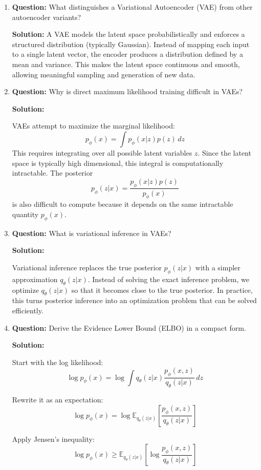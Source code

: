 \documentclass{article}
\begin{document}
\begin{enumerate}
\item \textbf{Question:} 
What distinguishes a Variational Autoencoder (VAE) from other autoencoder variants?

\textbf{Solution:}  
A VAE models the latent space probabilistically and enforces a structured distribution (typically Gaussian). Instead of mapping each input to a single latent vector, the encoder produces a distribution defined by a mean and variance. This makes the latent space continuous and smooth, allowing meaningful sampling and generation of new data.

\item \textbf{Question:}
Why is direct maximum likelihood training difficult in VAEs?

\textbf{Solution:}

VAEs attempt to maximize the marginal likelihood:
\[
p_\phi(x) = \int p_\phi(x|z)p(z)\,dz
\]
This requires integrating over all possible latent variables \(z\). Since the latent space is typically high dimensional, this integral is computationally intractable. The posterior
\[
p_\phi(z|x)=\frac{p_\phi(x|z)p(z)}{p_\phi(x)}
\]
is also difficult to compute because it depends on the same intractable quantity \(p_\phi(x)\).

\item \textbf{Question:}
What is variational inference in VAEs?

\textbf{Solution:}

Variational inference replaces the true posterior \(p_\phi(z|x)\) with a simpler approximation \(q_\theta(z|x)\). Instead of solving the exact inference problem, we optimize \(q_\theta(z|x)\) so that it becomes close to the true posterior. In practice, this turns posterior inference into an optimization problem that can be solved efficiently.

\item \textbf{Question:}
Derive the Evidence Lower Bound (ELBO) in a compact form.

\textbf{Solution:}

Start with the log likelihood:
\[
\log p_\phi(x)
=
\log \int q_\theta(z|x)\frac{p_\phi(x,z)}{q_\theta(z|x)}\,dz
\]

Rewrite it as an expectation:
\[
\log p_\phi(x)
=
\log
\mathbb{E}_{q_\theta(z|x)}
\left[
\frac{p_\phi(x,z)}{q_\theta(z|x)}
\right]
\]

Apply Jensen's inequality:
\[
\log p_\phi(x)
\ge
\mathbb{E}_{q_\theta(z|x)}
\left[
\log \frac{p_\phi(x,z)}{q_\theta(z|x)}
\right]
\]


\end{enumerate}
\end{document}
